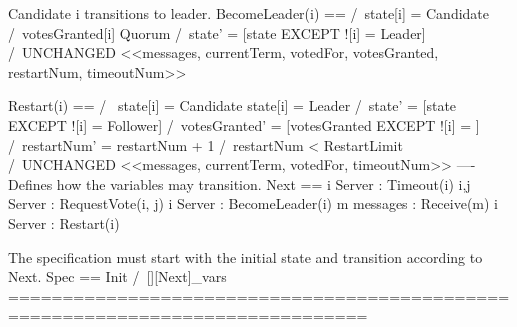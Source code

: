 \* Candidate i transitions to leader.
BecomeLeader(i) ==
    /\ state[i] = Candidate
    /\ votesGranted[i] \in Quorum
    /\ state'      = [state EXCEPT ![i] = Leader]
    /\ UNCHANGED <<messages, currentTerm, votedFor, votesGranted, restartNum, timeoutNum>>

Restart(i) == 
    /\ \/ state[i] = Candidate
       \/ state[i] = Leader 
    /\ state'        = [state EXCEPT ![i] = Follower]
    /\ votesGranted' = [votesGranted EXCEPT ![i] = {}]
    /\ restartNum'   = restartNum + 1
    /\ restartNum    < RestartLimit
    /\ UNCHANGED <<messages, currentTerm, votedFor, timeoutNum>>
----
\* Defines how the variables may transition.
Next ==\/ \E i \in Server : Timeout(i)
       \/ \E i,j \in Server : RequestVote(i, j)  
       \/ \E i \in Server : BecomeLeader(i)
       \/ \E m \in messages : Receive(m)
       \/ \E i \in Server : Restart(i)

\* The specification must start with the initial state and transition according
\* to Next.
Spec == Init /\ [][Next]_vars
===============================================================================